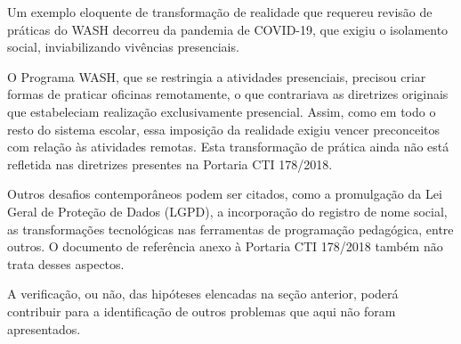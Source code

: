 \documentclass[
12pt,		%
openright,	%
twoside,  %
a4paper,			%
chapter=TITLE,		%
english,			%
french,				%
spanish,			%
brazil				%
]{USPSC-classe/USPSC}
\begin{document}
Um exemplo eloquente de transforma\c{c}\~ao de realidade que requereu revis\~ao de pr\'aticas do WASH decorreu da pandemia de COVID-19, que exigiu o isolamento social, inviabilizando viv\^encias presenciais.

















O Programa WASH, que se restringia a atividades presenciais, precisou criar formas de praticar oficinas remotamente, o que contrariava as diretrizes originais que estabeleciam  realiza\c{c}\~ao exclusivamente presencial. Assim, como em todo o resto do sistema escolar, essa imposi\c{c}\~ao da realidade exigiu vencer preconceitos  com rela\c{c}\~ao \`as atividades remotas. Esta transforma\c{c}\~ao de pr\'atica ainda n\~ao est\'a refletida nas diretrizes presentes na Portaria CTI 178/2018.

















Outros desafios contempor\^aneos podem ser citados, como a promulga\c{c}\~ao da Lei Geral de Prote\c{c}\~ao de Dados (LGPD), a incorpora\c{c}\~ao do registro de nome social, as transforma\c{c}\~oes tecnol\'ogicas nas ferramentas de programa\c{c}\~ao pedag\'ogica, entre outros. O documento de refer\^encia anexo \`a Portaria CTI 178/2018 tamb\'em n\~ao trata desses aspectos.

















A verifica\c{c}\~ao, ou n\~ao, das hip\'oteses elencadas na se\c{c}\~ao anterior, poder\'a contribuir para a identifica\c{c}\~ao de outros problemas que aqui n\~ao foram apresentados.
\end{document}
